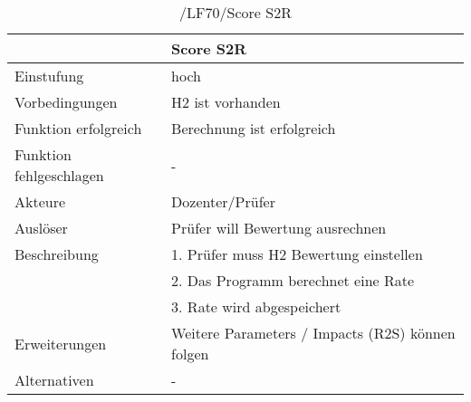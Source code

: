 	\begin{table}[H]
		\centering
		\caption{/LF70/Score S2R}
		\begin{tabularx}{\textwidth}{l|X}
			\toprule
			                        & Score S2R                                        \\ \midrule
			Einstufung              & hoch                                             \\
			Vorbedingungen          & H2 ist vorhanden                                 \\
			Funktion erfolgreich    & Berechnung ist erfolgreich                       \\
			Funktion fehlgeschlagen & -                                                \\
			Akteure                 & Dozenter/Prüfer                                  \\
			Auslöser                & Prüfer will Bewertung ausrechnen                 \\
			Beschreibung            & 1. Prüfer muss H2 Bewertung einstellen           \\
			                        & 2. Das Programm berechnet eine Rate              \\
			                        & 3. Rate wird abgespeichert                       \\
			Erweiterungen           & Weitere Parameters / Impacts (R2S) können folgen \\
			Alternativen            & -                                                \\ \bottomrule
		\end{tabularx}%
		\label{tab:LF70S2R}%
	\end{table}%

